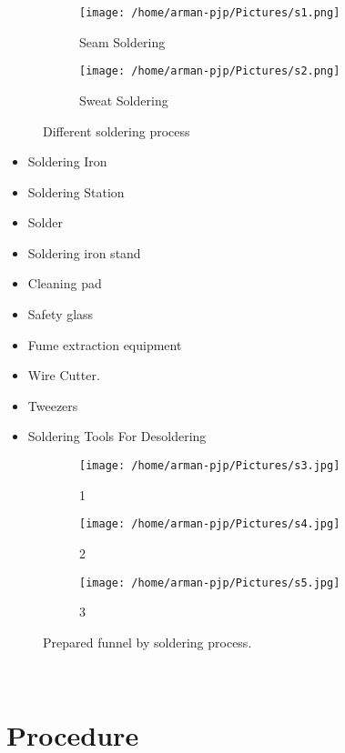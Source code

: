 \documentclass[a4,12pt]{article}
\begin{document}
\begin{figure}[h!]
	\centering
	\begin{subfigure}[b]{0.4\linewidth}
		\texttt{[image: /home/arman-pjp/Pictures/s1.png]}
		\caption{Seam Soldering}
	\end{subfigure}
	\begin{subfigure}[b]{0.4\linewidth}
		\texttt{[image: /home/arman-pjp/Pictures/s2.png]}
		\caption{Sweat Soldering}
	\end{subfigure}
	\caption{Different soldering process}
	\label{fig:coffee}
\end{figure}


\begin{itemize}
	\item Soldering Iron
	\item Soldering Station
	\item Solder
	\item Soldering iron stand
	\item Cleaning pad
	\item Safety glass
	\item Fume extraction equipment
	\item Wire Cutter.
	\item Tweezers
	\item Soldering Tools For Desoldering

	
\end{itemize}

\begin{figure}[h!]
	\centering
	\begin{subfigure}[b]{0.4\linewidth}
		\texttt{[image: /home/arman-pjp/Pictures/s3.jpg]}
		\caption{1}
	\end{subfigure}
	\begin{subfigure}[b]{0.4\linewidth}
		\texttt{[image: /home/arman-pjp/Pictures/s4.jpg]}
		\caption{2}
	\end{subfigure}
\begin{subfigure}[b]{0.4\linewidth}
	\texttt{[image: /home/arman-pjp/Pictures/s5.jpg]}
	\caption{3}
\end{subfigure}
	\caption{Prepared funnel by soldering process.}
	\label{fig:coffee}
\end{figure}\\


\section*{Procedure}
\end{document}
